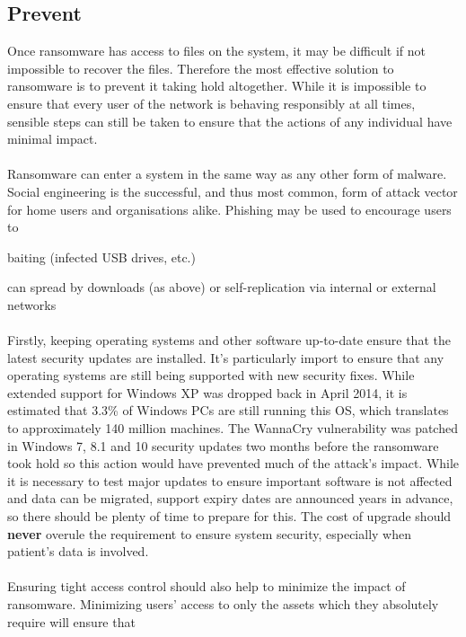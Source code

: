 \documentclass{article}
\begin{document}
\subsection{Prevent}
Once ransomware has access to files on the system, it may be difficult if not impossible to recover the files. Therefore the most effective solution to ransomware is to prevent it taking hold altogether. While it is impossible to ensure that every user of the network is behaving responsibly at all times, sensible steps can still be taken to ensure that the actions of any individual have minimal impact.
\\\\
Ransomware can enter a system in the same way as any other form of malware.
Social engineering is the successful, and thus most common, form of attack vector for home users and organisations alike. %
Phishing may be used to encourage users to 

baiting (infected USB drives, etc.)

can spread by downloads (as above)
or self-replication via internal or external networks
\\\\
Firstly, keeping operating systems and other software up-to-date ensure that the latest security updates are installed. It's particularly import to ensure that any operating systems are still being supported with new security fixes.
While extended support for Windows XP was dropped back in April 2014, it is estimated that 3.3\% of Windows PCs are still running this OS, which translates to approximately 140 million machines\cite{statcounter}.  The WannaCry vulnerability was patched in Windows 7, 8.1 and 10 security updates\cite{wannacry_patch2, wannacry_patch, windows10march} two months before the ransomware took hold so this action would have prevented much of the attack's impact. While it is necessary to test major updates to ensure important software is not affected and data can be migrated, support expiry dates are announced years in advance\cite{microsoft_lifecycle_factsheet}, so there should be plenty of time to prepare for this. The cost of upgrade should \textbf{never} overule the requirement to ensure system security, especially when patient's data is involved.%
\\\\
Ensuring tight access control should also help to minimize the impact of ransomware. Minimizing users' access to only the assets which they absolutely require will ensure that 
\end{document}
